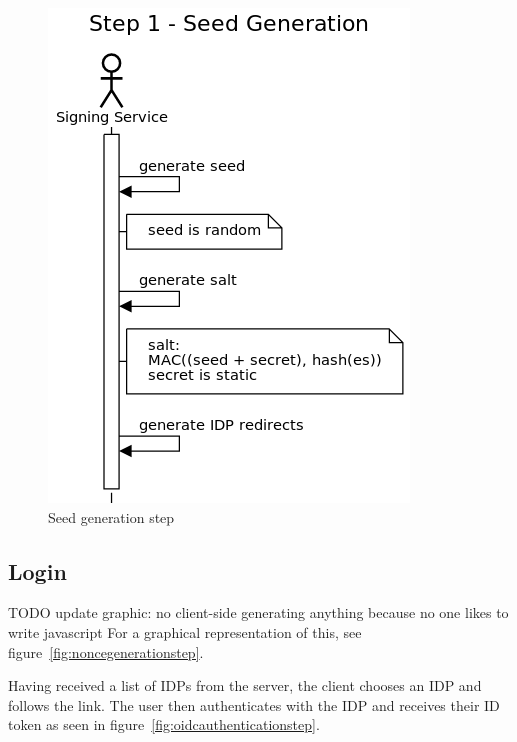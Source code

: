 \begin{figure}
	\begin{center}
		\includegraphics[scale=0.5]{images/protocol_step1_seed_generation.png}
		\caption{Seed generation step}
		\label{fig:seedgenerationstep}
	\end{center}
\end{figure}

\subsection{Login}\label{subsec:login}
TODO update graphic: no client-side generating anything because no one likes to write javascript
For a graphical representation of this, see figure~\ref{fig:noncegenerationstep}.

Having received a list of \gls{IDP}s from the server, the client chooses an \gls{IDP} and follows the link.
The user then authenticates with the \gls{IDP} and receives their ID token as seen in figure~\ref{fig:oidcauthenticationstep}.

